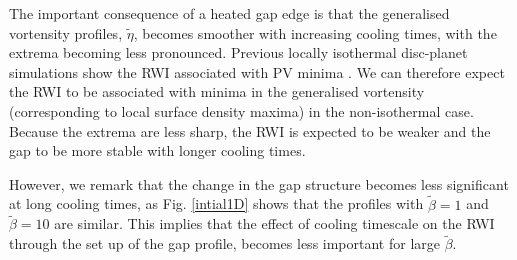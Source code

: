 The important consequence of a heated gap edge is that the
generalised vortensity profiles, $\tilde{\eta}$, becomes smoother with increasing
cooling times, with the extrema becoming less pronounced. Previous locally
isothermal disc-planet simulations show the RWI associated with PV
minima \citep{li05,lin10}. We can therefore expect the RWI to be associated with
minima in the generalised vortensity (corresponding to local surface
density maxima) in the non-isothermal case. Because the extrema are
less sharp, the RWI is expected to be weaker and the gap to be more
stable with longer cooling times.  


However, we remark that the change in the gap structure becomes less 
significant at long cooling times, as Fig. \ref{intial1D} shows that
the profiles with $\tilde{\beta}=1$ and $\tilde{\beta}=10$ are 
similar. This implies that the effect of cooling timescale on the
RWI through the set up of the gap profile, becomes less important for
large $\tilde{\beta}$. 

